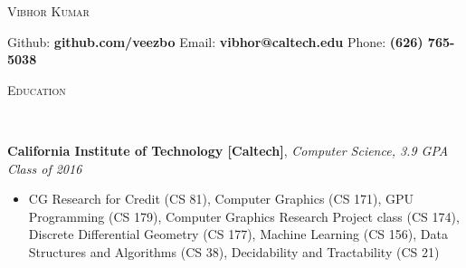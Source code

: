 \documentclass[9pt]{article}
\newenvironment{changemargin}[2]{%
  \begin{list}{}{%
    \setlength{\topsep}{0pt}%
    \setlength{\leftmargin}{#1}%
    \setlength{\rightmargin}{#2}%
    \setlength{\listparindent}{\parindent}%
    \setlength{\itemindent}{\parindent}%
    \setlength{\parsep}{\parskip}%
  }%
  \item[]}{\end{list}
}
\newcommand{\lineover}{
	\begin{changemargin}{-0.05in}{-0.05in}
		\vspace*{-8pt}
		\hrulefill \\
		\vspace*{-2pt}
	\end{changemargin}
}
\newcommand{\header}[1]{
	\begin{changemargin}{-0.5in}{-0.5in}
		\scshape{#1}\\
  	\lineover
	\end{changemargin}
}
\newenvironment{body} {
	\vspace*{-16pt}
	\begin{changemargin}{-0.25in}{-0.5in}
  }	
	{\end{changemargin}
}
\begin{document}
\begin{center} 
	{\Large \scshape Vibhor Kumar} 
\end{center}
Github: \textbf{github.com/veezbo} \hspace{5mm} Email: \textbf{vibhor@caltech.edu} \hfill Phone: \textbf{(626) 765-5038}\\
\vspace{3pt}
\smallskip
\header{Education}
\smallskip
\begin{body}
	\vspace{14pt}
	\textbf{California Institute of Technology [Caltech]}{}, \emph{Computer Science, 3.9 GPA} \hfill \emph{Class of 2016}{} \\
	\begin{itemize} \itemsep -0pt
	\item CG Research for Credit (CS 81), Computer Graphics (CS 171), GPU Programming (CS 179),  Computer Graphics Research Project class (CS 174), Discrete Differential Geometry (CS 177), Machine Learning (CS 156), Data Structures and Algorithms (CS 38), Decidability and Tractability (CS 21)
	\end{itemize}
\end{body}

\smallskip
\end{document}
